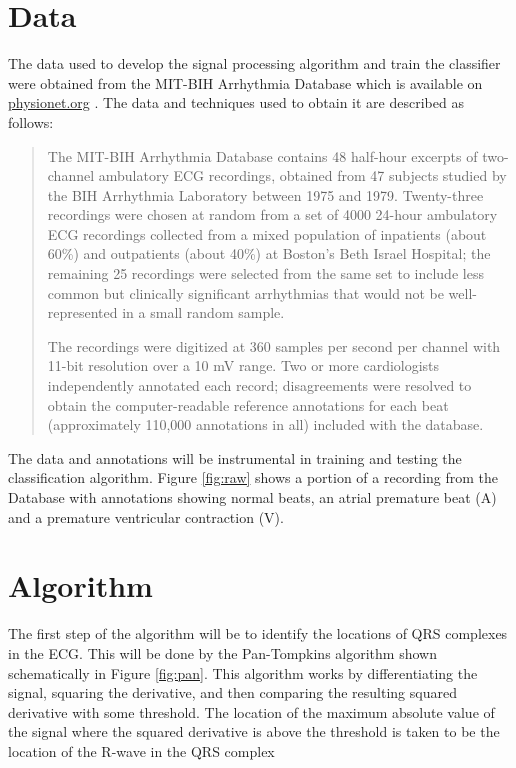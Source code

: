 \documentclass[titlepage,12pt,letter]{article}
\begin{document}
\section{Data}
The data used to develop the signal processing algorithm and train the
classifier were obtained from the MIT-BIH Arrhythmia Database which is available
on \url{physionet.org} \cite{MIT-BIH} \nocite{physionet}.  The data and
techniques used to obtain it are described as follows: 
\begin{quotation}
     The MIT-BIH Arrhythmia Database contains 48 half-hour excerpts of
     two-channel ambulatory ECG recordings, obtained from 47 subjects studied by
     the BIH Arrhythmia Laboratory between 1975 and 1979. Twenty-three
     recordings were chosen at random from a set of 4000 24-hour ambulatory ECG
     recordings collected from a mixed population of inpatients (about 60\%) and
     outpatients (about 40\%) at Boston's Beth Israel Hospital; the remaining 25
     recordings were selected from the same set to include less common but
     clinically significant arrhythmias that would not be well-represented in a
     small random sample.

     The recordings were digitized at 360 samples per second per channel with
     11-bit resolution over a 10 mV range. Two or more cardiologists
     independently annotated each record; disagreements were resolved to obtain
     the computer-readable reference annotations for each beat (approximately
     110,000 annotations in all) included with the database.
\end{quotation}

The data and annotations will be instrumental in training and testing the
classification algorithm.  Figure \ref{fig:raw} shows a portion of a recording
from the Database with annotations showing normal beats, an atrial premature
beat (A) and a premature ventricular contraction (V).  

\section{Algorithm}
The first step of the algorithm will be to identify the locations of QRS
complexes in the ECG.  This will be done by the Pan-Tompkins algorithm shown
schematically in Figure \ref{fig:pan}.  This algorithm works by differentiating
the signal, squaring the derivative, and then comparing the resulting squared
derivative with some threshold.  The location of the maximum absolute value of
the signal where the squared derivative is above the threshold is taken to be
the location of the R-wave in the QRS complex \cite{pan-tompkins85}
\end{document}
